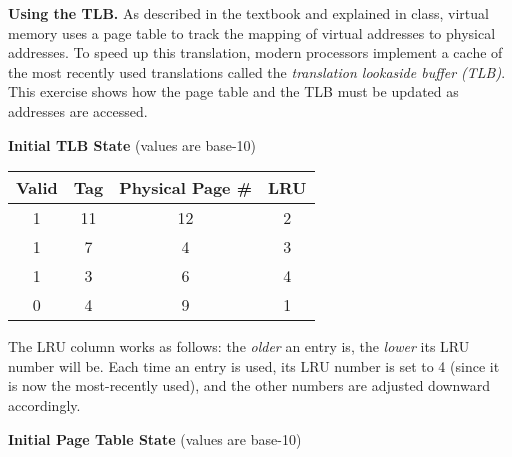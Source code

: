 \documentclass{exam}
\begin{document}
\begin{questions}

    \newpage

    \question[25]
    \textbf{Using the TLB.} As described in the textbook and explained in class,
    virtual memory uses a page table to track the mapping of virtual addresses
    to physical addresses. To speed up this translation, modern processors
    implement a cache of the most recently used translations called the
    \textit{translation lookaside buffer (TLB)}. This exercise shows how the
    page table and the TLB must be updated as addresses are accessed.

    \setlength{\columnseprule}{0.5pt}
    \begin{multicols}{2}
        \textbf{Initial TLB State} {\color{red} (values are base-10)}

        \begin{tabular}{|c|c|c|c|}
            \hline
            \textbf{Valid} & \textbf{Tag} & \textbf{Physical Page \#} & \textbf{LRU} \\
            \hline
            1 & 11 & 12 & 2 \\
            \hline
            1 & 7 & 4 & 3 \\
            \hline
            1 & 3 & 6 & 4 \\
            \hline
            0 & 4 & 9 & 1 \\
            \hline
        \end{tabular}

        The LRU column works as follows: the \textit{older} an entry is, the
        \textit{lower} its LRU number will be. Each time an entry is used, its
        LRU number is set to 4 (since it is now the most-recently used), and the
        other numbers are adjusted downward accordingly.

        \columnbreak

        \textbf{Initial Page Table State} {\color{red} (values are base-10)}


\end{multicols}
\end{questions}
\end{document}
